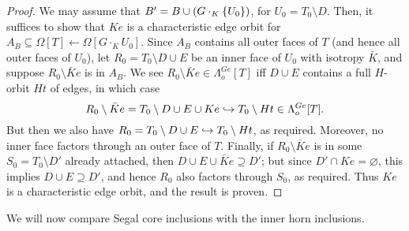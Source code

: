 \documentclass[a4paper,10p,draft]{article}%
\numberwithin{equation}{section}%
\begin{document}
\begin{proof}
      We may assume that $B' = B \cup (G\cdot_K \left\{U_0\right\})$, for $U_0 = T_0 \setminus D$.
      Then, it suffices to show that $K e$ is a characteristic edge orbit for
      $A_B \subseteq \Omega[T] \leftarrow \Omega[G \cdot_K U_0]$.
      Since $A_B$ contains all outer faces of $T$ (and hence all outer faces of $U_0$),
      let $R_0 = T_0 \setminus D \cup E$ be an inner face of $U_0$ with isotropy $\bar K$, and suppose
      $R_0 \setminus \bar K e$ is in $A_B$.
      We see $R_0 \setminus \bar K e \in \Lambda^{G e}_o[T]$ iff $D \cup E$ contains a full $H$-orbit $H t$ of edges, in which case
      \begin{equation}
            R_0 \setminus \bar K e = T_0 \setminus D \cup E \cup K e
            \hookrightarrow
            T_0 \setminus H t \in \Lambda^{G e}_o[T].
      \end{equation}
      But then we also have $R_0 = T_0 \setminus D \cup E \hookrightarrow T_0 \setminus H t$, as required.
      Moreover, no inner face factors through an outer face of $T$.
      Finally, if $R_0 \setminus \bar K e$ is in some $S_0 = T_0 \setminus D'$ already attached, then
      $D \cup E \cup \bar K e \supseteq D'$;
      but since $D' \cap K e = \varnothing$, this implies
      $D \cup E \supseteq D'$, and hence $R_0$ also factors through $S_0$, as required.
      Thus $K e$ is a characteristic edge orbit, and the result is proven.
\end{proof}



We will now compare Segal core inclusions with the inner horn inclusions.
\end{document}
